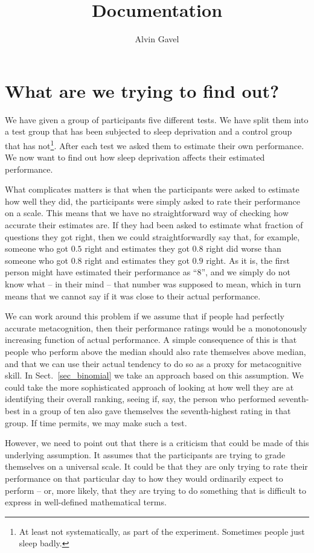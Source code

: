 \documentclass[10pt, twoside,a4paper]{article}
\title{Documentation}
\author{Alvin Gavel}
\date{}
\begin{document}
\maketitle

\tableofcontents

\newpage
\section{What are we trying to find out?}
We have given a group of participants five different tests. We have split them into a test group that has been subjected to sleep deprivation and a control group that has not\footnote{At least not systematically, as part of the experiment. Sometimes people just sleep badly.}. After each test we asked them to estimate their own performance. We now want to find out how sleep deprivation affects their estimated performance.

What complicates matters is that when the participants were asked to estimate how well they did, the participants were simply asked to rate their performance on a scale. This means that we have no straightforward way of checking how accurate their estimates are. If they had been asked to estimate what fraction of questions they got right, then we could straightforwardly say that, for example, someone who got $0.5$ right and estimates they got $0.8$ right did worse than someone who got $0.8$ right and estimates they got $0.9$ right. As it is, the first person might have estimated their performance as ``8'', and we simply do not know what -- in their mind -- that number was supposed to mean, which in turn means that we cannot say if it was close to their actual performance.

We can work around this problem if we assume that if people had perfectly accurate metacognition, then their performance ratings would be a monotonously increasing function of actual performance. A simple consequence of this is that people who perform above the median should also rate themselves above median, and that we can use their actual tendency to do so as a proxy for metacognitive skill. In Sect.~\ref{sec_binomial} we take an approach based on this assumption. We could take the more sophisticated approach of looking at how well they are at identifying their overall ranking, seeing if, say, the person who performed seventh-best in a group of ten also gave themselves the seventh-highest rating in that group. If time permits, we may make such a test.

However, we need to point out that there is a criticism that could be made of this underlying assumption. It assumes that the participants are trying to grade themselves on a universal scale. It could be that they are only trying to rate their performance on that particular day to how they would ordinarily expect to perform -- or, more likely, that they are trying to do something that is difficult to express in well-defined mathematical terms.
\end{document}
